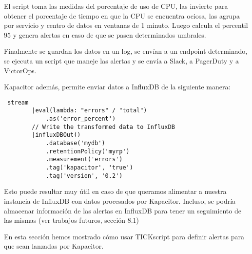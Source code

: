 El script toma las medidas del porcentaje de uso de CPU, las invierte para obtener el porcentaje de tiempo en que la CPU se encuentra ociosa, las agrupa por servicio y centro de datos en ventanas de 1 minuto. Luego calcula el percentil 95 y genera alertas en caso de que se pasen determinados umbrales.

Finalmente se guardan los datos en un log, se envían a un endpoint determinado, se ejecuta un script que maneje las alertas y se envía a Slack, a PagerDuty y a VictorOps.

Kapacitor además, permite enviar datos a InfluxDB de la siguiente manera:

\begin{lstlisting}
 stream
        |eval(lambda: "errors" / "total")
            .as('error_percent')
        // Write the transformed data to InfluxDB
        |influxDBOut()
            .database('mydb')
            .retentionPolicy('myrp')
            .measurement('errors')
            .tag('kapacitor', 'true')
            .tag('version', '0.2')
\end{lstlisting}


Esto puede resultar muy útil en caso de que queramos alimentar a nuestra instancia de InfluxDB con datos procesados por Kapacitor. Incluso, se podría almacenar información de las alertas en InfluxDB para tener un seguimiento de las mismas (ver trabajos futuros, sección 8.1)

En esta sección hemos mostrado cómo usar TICKscript para definir alertas para que sean lanzadas por Kapacitor.
